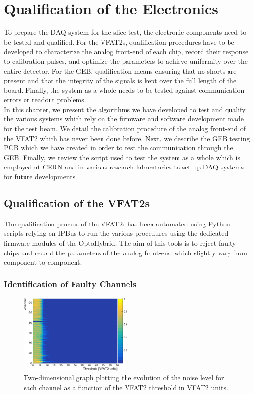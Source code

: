 \chapter{Qualification of the Electronics}
\label{chap:II-4-qualification}

  To prepare the DAQ system for the slice test, the electronic components need to be tested and qualified. For the VFAT2s, qualification procedures have to be developed to characterize the analog front-end of each chip, record their response to calibration pulses, and optimize the parameters to achieve uniformity over the entire detector. For the GEB, qualification means ensuring that no shorts are present and that the integrity of the signals is kept over the full length of the board. Finally, the system as a whole needs to be tested against communication errors or readout problems. \\

  In this chapter, we present the algorithms we have developed to test and qualify the various systems which rely on the firmware and software development made for the test beam. We detail the calibration procedure of the analog front-end of the VFAT2 which has never been done before. Next, we describe the GEB testing PCB which we have created in order to test the communication through the GEB. Finally, we review the script used to test the system as a whole which is employed at CERN and in various research laboratories to set up DAQ systems for future developments.

  \section{Qualification of the VFAT2s}

    The qualification process of the VFAT2s has been automated using Python scripts relying on IPBus to run the various procedures using the dedicated firmware modules of the OptoHybrid. The aim of this tools is to reject faulty chips and record the parameters of the analog front-end which slightly vary from component to component.

    \subsection{Identification of Faulty Channels}

      \begin{figure}[b!]
        \centering
        \includegraphics[width=0.5\textwidth]{img/plots/cThreshold_Channel-crop}
        \caption{Two-dimensional graph plotting the evolution of the noise level for each channel as a function of the VFAT2 threshold in VFAT2 units.}
        \label{fig:II-4-threshold}
      \end{figure}
      
